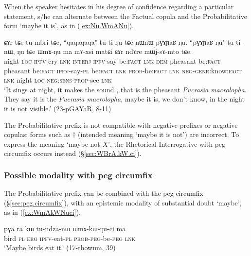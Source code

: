When the speaker hesitates in his degree of confidence regarding a particular statement, s/he can alternate between the Factual copula  and the Probabilitative form  `maybe it is', as in (\ref{ex:Nu.WmANu}).

 
 \begin{exe}
 \ex \label{ex:Nu.WmANu}
\gll ɕɤr tɕe tu-mbri tɕe, ``qaqaqaqa" tu-ti ŋu tɕe nɯnɯ pɣɤɲaʁ ŋu. ``pɣɤɲaʁ ŋu" tu-ti-nɯ, ŋu tɕe ɯmɤ-ŋu ma mɤ-xsi matɕi ɕɤr ndɤre mɯ́j-sɤ-mto tɕe. \\
night \textsc{loc} \textsc{ipfv}-cry \textsc{lnk} \textsc{interj} \textsc{ipfv}-say be:\textsc{fact} \textsc{lnk} \textsc{dem} pheasant be:\textsc{fact} pheasant be:\textsc{fact} \textsc{ipfv}-say-\textsc{pl} be:\textsc{fact} \textsc{lnk} \textsc{prob}-be:\textsc{fact} \textsc{lnk} \textsc{neg}-\textsc{genr}:know:\textsc{fact} \textsc{lnk} night \textsc{loc} \textsc{neg}:\textsc{sens}-\textsc{prop}-see \textsc{lnk} \\
\glt `It sings at night, it makes the sound , that is the pheasant \textit{Pucrasia macrolopha}. They say it is the \textit{Pucrasia macrolopha}, maybe it is, we don't know, in the night it is not visible.' (23-pGAYaR, 8-11)
 \end{exe}
 
The Probabilitative prefix is not compatible with negative prefixes or negative copulas: forms such as $\dagger$ (intended meaning `maybe it is not') are incorrect. To express the meaning `maybe not $X$', the Rhetorical Interrogative  with peg circumfix occurs instead (§\ref{sec:WBrA.kW.ci}).
 
\subsubsection{Possible modality with peg circumfix} \label{sec:WmA.kW.ci}
The Probabilitative prefix can be combined with the peg circumfix (§\ref{sec:peg.circumfix}), with an epistemic modality of substantial doubt  `maybe', as in (\ref{ex:WmAkWNuci}).

\begin{exe}
\ex \label{ex:WmAkWNuci}
\gll pɣa ra kɯ tu-ndza-nɯ ɯmɤ-kɯ-ŋu-ci ma \\
bird \textsc{pl} \textsc{erg} \textsc{ipfv}-eat-\textsc{pl}  \textsc{prob}-\textsc{peg}-be-\textsc{peg} \textsc{lnk} \\
\glt `Maybe birds eat it.' (17-thowum, 39)
\end{exe}

